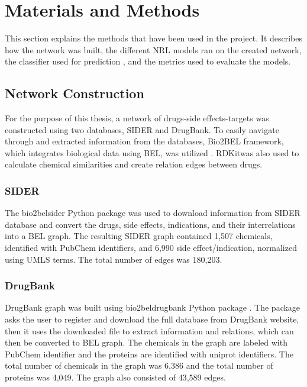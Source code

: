 \chapter{Materials and Methods}
\label{methods}

This section explains the methods that have been used in the project. It describes how the network was built, the different \ac{NRL} models ran on the created network, the classifier used for prediction , and the metrics used to evaluate the models.

\section{Network Construction}
For the purpose of this thesis, a network of drugs-side effects-targets was constructed using two databases, \ac{SIDER} and DrugBank. To easily navigate through and extracted information from the databases, Bio2BEL framework, which integrates biological data using \ac{BEL}, was utilized \cite{hoyt_integration_2019}. RDKit\footnotemark was also used to calculate chemical similarities and create relation edges between drugs.

\subsection{SIDER}
The bio2bel\textunderscore sider Python package \cite{charles_tapley_hoyt_bio2bel/sider_2018} was used to download information from \ac{SIDER} database and convert the drugs, side effects, indications, and their interrelations into a \ac{BEL} graph. The resulting \ac{SIDER} graph contained 1,507 chemicals, identified with PubChem identifiers, and 6,990 side effect/indication, normalized using \ac{UMLS} terms. The total number of edges was 180,203.

\subsection{DrugBank}
DrugBank graph was built using bio2bel\textunderscore drugbank Python package \cite{charles_tapley_hoyt_bio2bel/drugbank_2018}. The package asks the user to register and download the full database from DrugBank website, then it uses the downloaded file to extract information and relations, which can then be converted to \ac{BEL} graph. The chemicals in the graph are labeled with PubChem identifier and the proteins are identified with uniprot identifiers. The total number of chemicals in the graph was 6,386 and the total number of proteins was 4,049. The graph also consisted of 43,589 edges.

